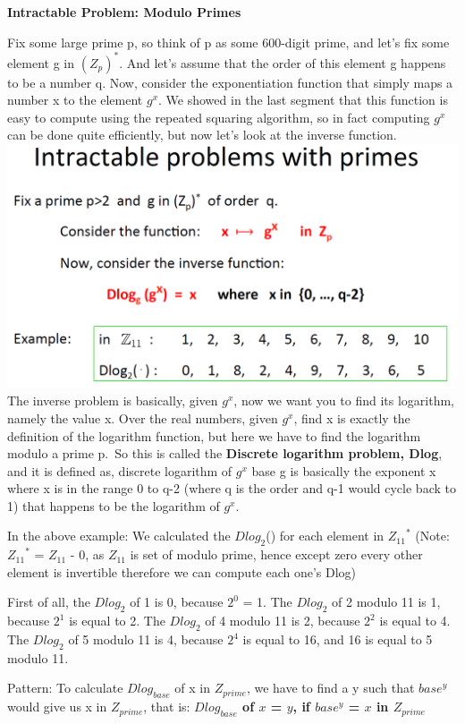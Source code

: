 \documentclass[11pt]{article}
\makeatletter
\def\maxwidth{\ifdim\Gin@nat@width>\linewidth\linewidth
    \else\Gin@nat@width\fi}
\let\Oldincludegraphics\includegraphics
\renewcommand{\includegraphics}[1]{\Oldincludegraphics[width=.8\maxwidth]{#1}}
\makeatother
\begin{document}
\textbf{Intractable Problem: Modulo Primes}

Fix some large prime p, so think of p as some 600-digit prime, and let's
fix some element g in \((Z_{p})^{*}\). And let's assume that the order
of this element g happens to be a number q. Now, consider the
exponentiation function that simply maps a number x to the element
\(g^{x}\). We showed in the last segment that this function is easy to
compute using the repeated squaring algorithm, so in fact computing
\(g^{x}\) can be done quite efficiently, but now let's look at the
inverse function. \includegraphics{./Images/NT-IntractPrimes.png} The
inverse problem is basically, given \(g^{x}\), now we want you to find
its logarithm, namely the value x. Over the real numbers, given
\(g^{x}\), find x is exactly the definition of the logarithm function,
but here we have to find the logarithm modulo a prime p.~So this is
called the \textbf{Discrete logarithm problem, Dlog}, and it is defined
as, discrete logarithm of \(g^{x}\) base g is basically the exponent x
where x is in the range 0 to q-2 (where q is the order and q-1 would
cycle back to 1) that happens to be the logarithm of \(g^{x}\).

In the above example: We calculated the \(Dlog_{2}\)() for each element
in \({Z_{11}}^{*}\) (Note: \({Z_{11}}^{*}\) = \(Z_{11}\) - 0, as
\(Z_{11}\) is set of modulo prime, hence except zero every other element
is invertible therefore we can compute each one's Dlog)

First of all, the \(Dlog_{2}\) of 1 is 0, because \(2^{0}\) = 1. The
\(Dlog_{2}\) of 2 modulo 11 is 1, because \(2^{1}\) is equal to 2. The
\(Dlog_{2}\) of 4 modulo 11 is 2, because \(2^{2}\) is equal to 4. The
\(Dlog_{2}\) of 5 modulo 11 is 4, because \(2^{4}\) is equal to 16, and
16 is equal to 5 modulo 11.

Pattern: To calculate \(Dlog_{base}\) of x in \(Z_{prime}\), we have to
find a y such that \(base^{y}\) would give us x in \(Z_{prime}\), that
is: \textbf{\(Dlog_{base}\) of \(x\) = \(y\), if \(base^{y}\) = \(x\) in
\(Z_{prime}\) }
\end{document}
